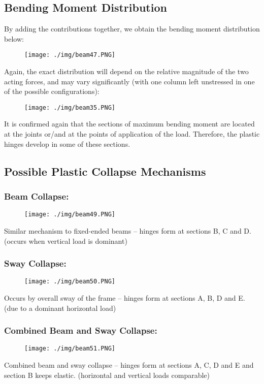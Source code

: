 \subsection{Bending Moment Distribution}
By adding the contributions together, we obtain the bending moment distribution below:
\begin{figure}[H]
  \centering
  \texttt{[image: ./img/beam47.PNG]}
\end{figure}
Again, the exact distribution will depend on the relative magnitude of the two acting forces, and may vary significantly (with one column left unstressed in one of the possible configurations):
\begin{figure}[H]
  \centering
  \texttt{[image: ./img/beam35.PNG]}
\end{figure}
It is confirmed again that the sections of maximum bending moment are located at the joints or/and at the points of application of the load. Therefore, the plastic hinges develop in some of these sections.
\subsection{Possible Plastic Collapse Mechanisms}
\subsubsection{Beam Collapse:}
\begin{figure}[H]
  \centering
  \texttt{[image: ./img/beam49.PNG]}
\end{figure}
Similar mechanism to fixed-ended beams – hinges form at sections B, C and D. (occurs when vertical load is dominant)
\subsubsection{Sway Collapse:}
\begin{figure}[H]
  \centering
  \texttt{[image: ./img/beam50.PNG]}
\end{figure}
Occurs by overall sway of the frame – hinges form at sections A, B, D and E. (due to a dominant horizontal load)
\subsubsection{Combined Beam and Sway Collapse:}
\begin{figure}[H]
  \centering
  \texttt{[image: ./img/beam51.PNG]}
\end{figure}
Combined beam and sway collapse – hinges form at sections A, C, D and E and section B keeps elastic. (horizontal and vertical loads comparable)
